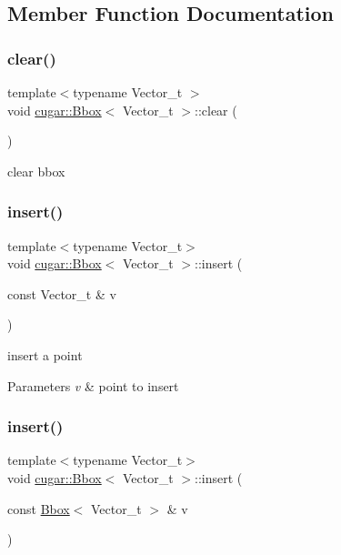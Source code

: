 \subsection{Member Function Documentation}
\mbox{\label{structcugar_1_1_bbox_a9d73d928dcebfa0a9fd7f5ada019d3b9}} 
\subsubsection{\texorpdfstring{clear()}{clear()}}
{\footnotesize\ttfamily template$<$typename Vector\+\_\+t $>$ \\
void \hyperlink{structcugar_1_1_bbox}{cugar\+::\+Bbox}$<$ Vector\+\_\+t $>$\+::clear (\begin{DoxyParamCaption}{ }\end{DoxyParamCaption})}

clear bbox \mbox{\label{structcugar_1_1_bbox_ace1ccbf9df5fd13af14675c47a0eaba3}} 
\subsubsection{\texorpdfstring{insert()}{insert()}\hspace{0.1cm}{\footnotesize\ttfamily [1/2]}}
{\footnotesize\ttfamily template$<$typename Vector\+\_\+t$>$ \\
void \hyperlink{structcugar_1_1_bbox}{cugar\+::\+Bbox}$<$ Vector\+\_\+t $>$\+::insert (\begin{DoxyParamCaption}\item[{const Vector\+\_\+t \&}]{v }\end{DoxyParamCaption})}

insert a point


\begin{DoxyParams}{Parameters}
{\em v} & point to insert \\
\hline
\end{DoxyParams}
\mbox{\label{structcugar_1_1_bbox_a615bba316b80598c6ecae65f2156167d}} 
\subsubsection{\texorpdfstring{insert()}{insert()}\hspace{0.1cm}{\footnotesize\ttfamily [2/2]}}
{\footnotesize\ttfamily template$<$typename Vector\+\_\+t$>$ \\
void \hyperlink{structcugar_1_1_bbox}{cugar\+::\+Bbox}$<$ Vector\+\_\+t $>$\+::insert (\begin{DoxyParamCaption}\item[{const \hyperlink{structcugar_1_1_bbox}{Bbox}$<$ Vector\+\_\+t $>$ \&}]{v }\end{DoxyParamCaption})}

